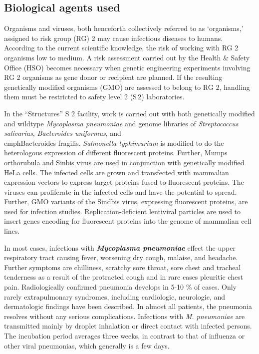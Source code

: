 \subsection*{Biological agents used}\label{sec:agents}
Organisms and viruses, both henceforth collectively referred to as ‘organisms,’ assigned to risk group (RG) 2 may cause infectious diseases to humans. According to the current scientific knowledge, the risk of working with RG 2 organisms low to medium. A risk assessment carried out by the Health \& Safety Office (HSO) becomes necessary when genetic engineering experiments involving RG 2 organisms as gene donor or recipient are planned. If the resulting genetically modified organisms (GMO) are assessed to belong to RG 2, handling them must be restricted to safety level 2 (S\,2) laboratories. 
\newline

In the “Structures” S 2 facility, work is carried out with both genetically modified and wildtype \emph{Mycoplasma pneumoniae} and genome libraries of \emph{Streptococcus salivarius}, \emph{Bacteroides uniformus}, and \\emph{Bacteroides fragilis}. \emph{Salmonella typhimurium} is modified to do the heterologous expression of different fluorescent proteins. Further, Mumps orthorubula and Sinbis virus are used in conjunction with genetically modified HeLa cells. The infected cells are grown and transfected with mammalian expression vectors to express target proteins fused to fluorescent proteins. The viruses can proliferate in the infected cells and have the potential to spread. Further, GMO variants of the Sindbis virus, expressing fluorescent proteins, are used for infection studies. Replication-deficient lentiviral particles are used to insert genes encoding for fluorescent proteins into the genome of mammalian cell lines.
\newline

In most cases, infections with \textbf{\emph{Mycoplasma pneumoniae}} effect the upper respiratory tract causing fever, worsening dry cough, malaise, and headache. Further symptoms are chilliness, scratchy sore throat, sore chest and tracheal tenderness as a result of the protracted cough and in rare cases pleuritic chest pain. Radiologically confirmed pneumonia develops in 5-10 \% of cases. Only rarely extrapulmonary syndromes, including cardiologic, neurologic, and dermatologic findings have been described. In almost all patients, the pneumonia resolves without any serious complications. Infections with \emph{M. pneumoniae} are transmitted mainly by droplet inhalation or direct contact with infected persons. The incubation period averages three weeks, in contrast to that of influenza or other viral pneumonias, which generally is a few days. 
\newline

